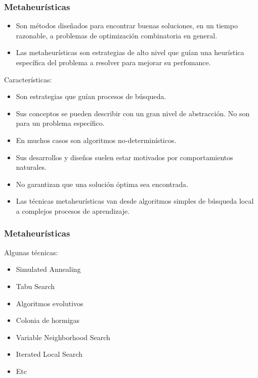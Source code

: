\documentclass{beamer}
\begin{document}
\begin{frame}
\frametitle{Metaheurísticas}

\begin{itemize}
    \item Son métodos diseñados para encontrar buenas soluciones, en un tiempo razonable, a problemas de optimización combinatoria en general.
    \pause
    \item Las metaheurísticas son estrategias de alto nivel que guían una heurística específica del problema a resolver para mejorar su perfomance.
    \pause
\end{itemize}

Caracter\'isticas:

\begin{itemize}
    \item Son estrategias que gu\'ian procesos de búsqueda.
    \pause
    \item Sus conceptos se pueden describir con un gran nivel de abstracción. No son para un problema específico.
    \pause
    \item En muchos casos son algoritmos no-determin\'isticos.
    \pause
    \item Sus desarrollos y diseños suelen estar motivados por comportamientos naturales.
    \pause
    \item No garantizan que una soluci\'on \'optima sea encontrada.
    \pause
    \item Las t\'ecnicas metaheur\'isticas van desde algoritmos simples de b\'usqueda local a complejos procesos de aprendizaje.
\end{itemize}

\end{frame}


\begin{frame}
\frametitle{Metaheurísticas}

Algunas técnicas:

\begin{itemize}
    \item Simulated Annealing
    \pause
    \item Tabu Search
    \pause
    \item Algoritmos evolutivos
    \pause
    \item Colonia de hormigas
    \pause
    \item Variable Neighborhood Search
    \pause
    \item Iterated Local Search
    \pause
    \item Etc
\end{itemize}

\end{frame}
\end{document}
